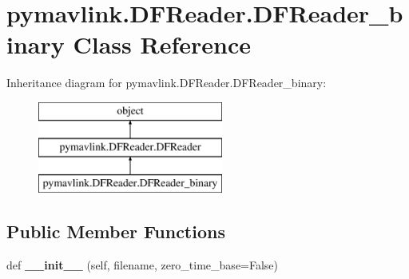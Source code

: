 \hypertarget{classpymavlink_1_1DFReader_1_1DFReader__binary}{}\section{pymavlink.\+D\+F\+Reader.\+D\+F\+Reader\+\_\+binary Class Reference}
\label{classpymavlink_1_1DFReader_1_1DFReader__binary}
Inheritance diagram for pymavlink.\+D\+F\+Reader.\+D\+F\+Reader\+\_\+binary\+:\begin{figure}[H]
\begin{center}
\leavevmode
\includegraphics[height=3.000000cm]{classpymavlink_1_1DFReader_1_1DFReader__binary}
\end{center}
\end{figure}
\subsection*{Public Member Functions}
\begin{DoxyCompactItemize}
\item 
\mbox{\label{classpymavlink_1_1DFReader_1_1DFReader__binary_ac46a1c2d0b542bf8a571362f5d91840d}} 
def {\bfseries \+\_\+\+\_\+init\+\_\+\+\_\+} (self, filename, zero\+\_\+time\+\_\+base=False)
\end{DoxyCompactItemize}
